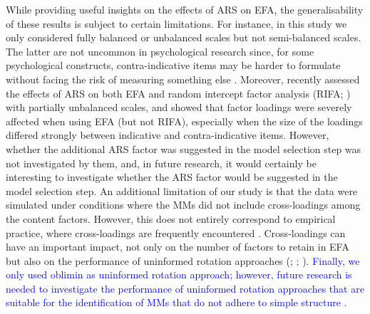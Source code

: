 \documentclass[a4paper,man,natbib]{apa6}
\begin{document}
\begin{linenumbers}



While providing useful insights on the effects of ARS on EFA, the generalisability of these results is subject to certain limitations. For instance, in this study we only considered fully balanced or unbalanced scales but not semi-balanced scales. The latter are not uncommon in psychological research since, for some psychological constructs, contra-indicative items may be harder to formulate without facing the risk of measuring something else \citep{van2013response}. Moreover, \citet{de2020comparing} recently assessed the effects of ARS on both EFA and random intercept factor analysis (RIFA; \citealp{maydeu2006random}) with partially unbalanced scales, and showed that factor loadings were severely affected when using EFA (but not RIFA), especially when the size of the loadings differed strongly between indicative and contra-indicative items. However, whether the additional ARS factor was suggested in the model selection step was not investigated by them, and, in future research, it would certainly be interesting to investigate whether the ARS factor would be suggested in the model selection step. An additional limitation of our study is that the data were simulated under conditions where the MMs did not include cross-loadings among the content factors. However, this does not entirely correspond to empirical practice, where cross-loadings are frequently encountered \citep{li2020effects}. Cross-loadings can have an important impact, not only on the number of factors to retain in EFA \citep{li2020effects} but also on the performance of uninformed rotation approaches (\citealp{lorenzo1999promin}; \citealp{ferrando2000unrestricted}; \citealp{schmitt2011rotation}).\label{refpage:R1Mj2b} \textcolor{blue}{Finally, we only used oblimin as uninformed rotation approach; however, future research is needed to investigate the performance of uninformed rotation approaches that are suitable for the identification of MMs that do not adhere to simple structure \citep{beauducel2020identification}.} 








\end{linenumbers}
\end{document}
